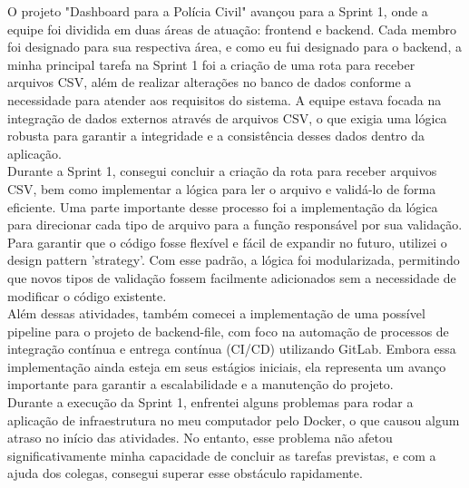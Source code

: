
O projeto "Dashboard para a Polícia Civil" avançou para a Sprint 1, onde a equipe foi dividida em duas áreas de atuação: frontend e backend. Cada membro foi designado para sua respectiva área, e como eu fui designado para o backend, a minha principal tarefa na Sprint 1 foi a criação de uma rota para receber arquivos CSV, além de realizar alterações no banco de dados conforme a necessidade para atender aos requisitos do sistema. A equipe estava focada na integração de dados externos através de arquivos CSV, o que exigia uma lógica robusta para garantir a integridade e a consistência desses dados dentro da aplicação.\\
Durante a Sprint 1, consegui concluir a criação da rota para receber arquivos CSV, bem como implementar a lógica para ler o arquivo e validá-lo de forma eficiente. Uma parte importante desse processo foi a implementação da lógica para direcionar cada tipo de arquivo para a função responsável por sua validação. Para garantir que o código fosse flexível e fácil de expandir no futuro, utilizei o design pattern 'strategy'. Com esse padrão, a lógica foi modularizada, permitindo que novos tipos de validação fossem facilmente adicionados sem a necessidade de modificar o código existente.\\
Além dessas atividades, também comecei a implementação de uma possível pipeline para o projeto de backend-file, com foco na automação de processos de integração contínua e entrega contínua (CI/CD) utilizando GitLab. Embora essa implementação ainda esteja em seus estágios iniciais, ela representa um avanço importante para garantir a escalabilidade e a manutenção do projeto.\\
Durante a execução da Sprint 1, enfrentei alguns problemas para rodar a aplicação de infraestrutura no meu computador pelo Docker, o que causou algum atraso no início das atividades. No entanto, esse problema não afetou significativamente minha capacidade de concluir as tarefas previstas, e com a ajuda dos colegas, consegui superar esse obstáculo rapidamente.



